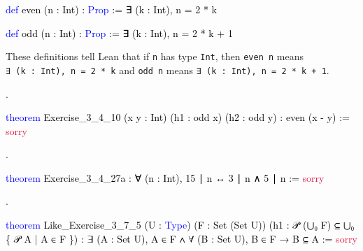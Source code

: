 \documentclass[
  letterpaper,
  DIV=11,
  numbers=noendperiod]{scrreprt}
\newenvironment{Shaded}{\begin{snugshade}}{\end{snugshade}}
\newcommand{\ConstantTok}[1]{\textcolor[rgb]{0.56,0.35,0.01}{#1}}
\newcommand{\KeywordTok}[1]{\textcolor[rgb]{0.00,0.23,0.31}{#1}}
\newcommand{\NormalTok}[1]{\textcolor[rgb]{0.00,0.23,0.31}{#1}}
\renewcommand{\NormalTok}[1]{\textcolor[HTML]{000000}{#1}}
\renewcommand{\KeywordTok}[1]{\textcolor[HTML]{0000FF}{#1}}
\renewcommand{\ConstantTok}[1]{\textcolor[HTML]{DC143C}{#1}}
\newcommand{\nobreakShaded}{\renewenvironment{Shaded}
	{\begin{tcolorbox}[frame hidden, enhanced, interior hidden, boxrule=0pt,
		borderline west={3pt}{0pt}{shadecolor}, sharp corners]}
	{\end{tcolorbox}}}
\newenvironment{numex}[1]
	{\begin{minipage}[t]{0.04\textwidth}\vspace{8pt}{#1}.
		\end{minipage}\nobreakShaded\begin{minipage}[t]{0.96\textwidth}\vspace{0pt}}
	{\end{minipage}}
\theoremstyle{remark}
\begin{document}
\begin{Shaded}
\begin{Highlighting}[]
\KeywordTok{def}\NormalTok{ even (n : Int) : }\KeywordTok{Prop}\NormalTok{ := ∃ (k : Int), n = 2 * k}

\KeywordTok{def}\NormalTok{ odd (n : Int) : }\KeywordTok{Prop}\NormalTok{ := ∃ (k : Int), n = 2 * k + 1}
\end{Highlighting}
\end{Shaded}

These definitions tell Lean that if \texttt{n} has type \texttt{Int},
then \texttt{even\ n} means \texttt{∃\ (k\ :\ Int),\ n\ =\ 2\ *\ k} and
\texttt{odd\ n} means \texttt{∃\ (k\ :\ Int),\ n\ =\ 2\ *\ k\ +\ 1}.

\begin{numex}{3}

\begin{Shaded}
\begin{Highlighting}[]
\KeywordTok{theorem}\NormalTok{ Exercise\_3\_4\_10 (x y : Int)}
\NormalTok{    (h1 : odd x) (h2 : odd y) : even (x {-} y) := }\ConstantTok{sorry}
\end{Highlighting}
\end{Shaded}

\end{numex}

\begin{numex}{4}

\begin{Shaded}
\begin{Highlighting}[]
\KeywordTok{theorem}\NormalTok{ Exercise\_3\_4\_27a :}
\NormalTok{    ∀ (n : Int), 15 ∣ n ↔ 3 ∣ n ∧ 5 ∣ n := }\ConstantTok{sorry}
\end{Highlighting}
\end{Shaded}

\end{numex}

\begin{numex}{5}

\begin{Shaded}
\begin{Highlighting}[]
\KeywordTok{theorem}\NormalTok{ Like\_Exercise\_3\_7\_5 (U : }\KeywordTok{Type}\NormalTok{) (F : Set (Set U))}
\NormalTok{    (h1 : 𝒫 (⋃₀ F) ⊆ ⋃₀ \{ 𝒫 A | A ∈ F \}) :}
\NormalTok{    ∃ (A : Set U), A ∈ F ∧ ∀ (B : Set U), B ∈ F → B ⊆ A := }\ConstantTok{sorry}
\end{Highlighting}
\end{Shaded}

\end{numex}
\end{document}
